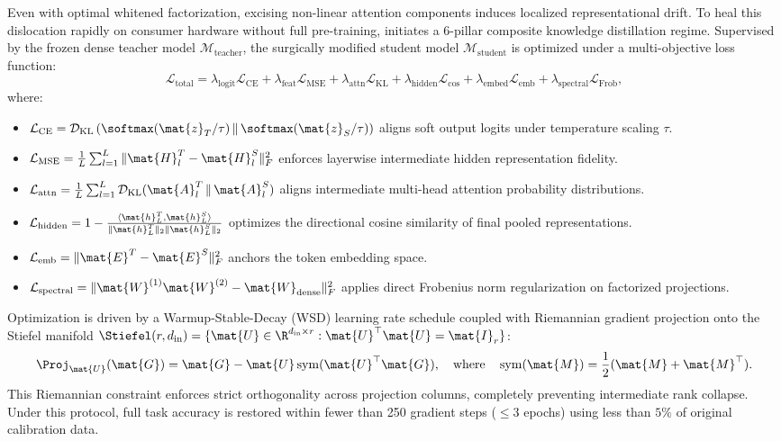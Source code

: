 Even with optimal whitened factorization, excising non-linear attention components induces localized representational drift.
To heal this dislocation rapidly on consumer hardware without full pre-training, \neuralops{} initiates a 6-pillar composite knowledge distillation regime.
Supervised by the frozen dense teacher model $\mathcal{M}_{\text{teacher}}$, the surgically modified student model $\mathcal{M}_{\text{student}}$ is optimized under a multi-objective loss function:
\begin{equation}
\label{eq:composite_kd_loss}
\mathcal{L}_{\text{total}} = \lambda_{\text{logit}} \mathcal{L}_{\text{CE}} + \lambda_{\text{feat}} \mathcal{L}_{\text{MSE}} + \lambda_{\text{attn}} \mathcal{L}_{\text{KL}} + \lambda_{\text{hidden}} \mathcal{L}_{\text{cos}} + \lambda_{\text{embed}} \mathcal{L}_{\text{emb}} + \lambda_{\text{spectral}} \mathcal{L}_{\text{Frob}},
\end{equation}
where:
\begin{itemize}
    \item $\mathcal{L}_{\text{CE}} = \mathcal{D}_{\text{KL}}\left(\softmax(\mat{z}_T / \tau) \,\|\, \softmax(\mat{z}_S / \tau)\right)$ aligns soft output logits under temperature scaling $\tau$.
    \item $\mathcal{L}_{\text{MSE}} = \frac{1}{L} \sum_{l=1}^L \|\mat{H}_l^T - \mat{H}_l^S\|_F^2$ enforces layerwise intermediate hidden representation fidelity.
    \item $\mathcal{L}_{\text{attn}} = \frac{1}{L} \sum_{l=1}^L \mathcal{D}_{\text{KL}}(\mat{A}_l^T \,\|\, \mat{A}_l^S)$ aligns intermediate multi-head attention probability distributions.
    \item $\mathcal{L}_{\text{hidden}} = 1 - \frac{\langle \mat{h}_L^T, \mat{h}_L^S \rangle}{\|\mat{h}_L^T\|_2 \|\mat{h}_L^S\|_2}$ optimizes the directional cosine similarity of final pooled representations.
    \item $\mathcal{L}_{\text{emb}} = \|\mat{E}^T - \mat{E}^S\|_F^2$ anchors the token embedding space.
    \item $\mathcal{L}_{\text{spectral}} = \|\mat{W}^{(1)}\mat{W}^{(2)} - \mat{W}_{\text{dense}}\|_F^2$ applies direct Frobenius norm regularization on factorized projections.
\end{itemize}
Optimization is driven by a Warmup-Stable-Decay (WSD) learning rate schedule coupled with Riemannian gradient projection onto the Stiefel manifold $\Stiefel(r, d_{\text{in}}) = \{\mat{U} \in \R^{d_{\text{in}} \times r} : \mat{U}^\top \mat{U} = \mat{I}_r\}$:
\begin{equation}
\label{eq:stiefel_projection_brief}
\Proj_{\mat{U}}(\mat{G}) = \mat{G} - \mat{U} \operatorname{sym}(\mat{U}^\top \mat{G}), \quad \text{where} \quad \operatorname{sym}(\mat{M}) = \frac{1}{2}(\mat{M} + \mat{M}^\top).
\end{equation}
This Riemannian constraint enforces strict orthogonality across projection columns, completely preventing intermediate rank collapse.
Under this protocol, full task accuracy is restored within fewer than 250 gradient steps ($\le 3$ epochs) using less than $5\%$ of original calibration data.


